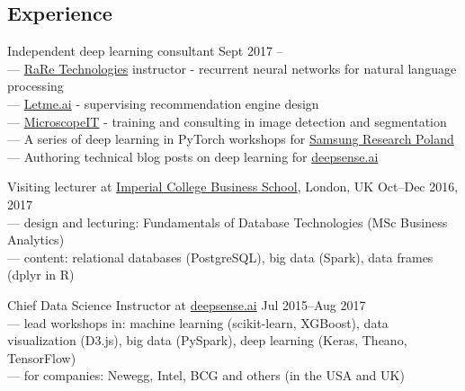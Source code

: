 \documentclass[margin,line]{resume}
\begin{document}
\begin{resume}

    \section{\mysidestyle Experience}

    \begin{list2}

    \item Independent deep learning consultant \hfill {Sept 2017 --}\\
      --- \href{https://rare-technologies.com/}{RaRe Technologies} instructor - recurrent neural networks for natural language processing\\
      --- \href{https://letme.ai/}{Letme.ai} - supervising recommendation engine design\\
      --- \href{http://www.microscopeit.com/}{MicroscopeIT} - training and consulting in image detection and segmentation\\
      --- A series of deep learning in PyTorch workshops for \href{https://research.samsung.com/}{Samsung Research Poland}\\
      --- Authoring technical blog posts on deep learning for \href{https://deepsense.ai/}{deepsense.ai}

    \item Visiting lecturer at \href{https://wwwf.imperial.ac.uk/business-school/}{Imperial College Business School}, London, UK \hfill Oct--Dec 2016, 2017\\
        --- design and lecturing: Fundamentals of Database Technologies (MSc Business Analytics)\\
        --- content: relational databases (PostgreSQL), big data (Spark), data frames (dplyr in R)

    \item Chief Data Science Instructor at \href{https://deepsense.ai/}{deepsense.ai} \hfill Jul 2015--Aug 2017\\
        --- lead workshops in: machine learning (scikit-learn, XGBoost), data visualization (D3.js), big data (PySpark), deep learning (Keras, Theano, TensorFlow)\\
        --- for companies: Newegg, Intel, BCG and others (in the USA and UK)


\end{list2}
\end{resume}
\end{document}
